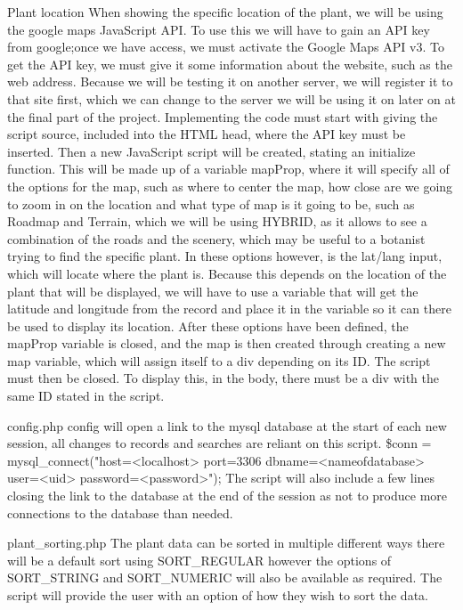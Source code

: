 Plant location
When showing the specific location of the plant, we will be using the google maps JavaScript API. To use this we will have to gain an API key from google;once we have access, we must activate the Google Maps API v3. To get the API key, we must give it some information about the website, such as the web address. Because we will be testing it on another server, we will register it to that site first, which we can change to the server we will be using it on later on at the final part of the project.
Implementing the code must start with giving the script source, included into the HTML head, where the API key must be inserted.  Then a new JavaScript script will be created, stating an initialize function. This will be made up of a variable mapProp, where it will specify all of the options for the map, such as where to center the map, how close are we going to zoom in on the location and what type of map is it going to be, such as Roadmap and Terrain, which we will be using HYBRID, as it allows to see a combination of the roads and the scenery, which may be useful to a botanist trying to find the specific plant. In these options however, is the lat/lang input, which will locate where the plant is. Because this depends on the location of the plant that will be displayed, we will have to use a variable that will get the latitude and longitude from the record and place it in the variable so it can there be used to display its location. After these options have been defined, the mapProp variable is closed, and the map is then created through creating a new map variable, which will assign itself to a div depending on its ID. The script must then be closed. To display this, in the body, there must be a div with the same ID stated in the script. 

config.php
config will open a link to the mysql database at the start of each new session, all changes to records and searches are reliant on this script.
\$conn = mysql\_connect("host=<localhost> 
port=3306 dbname=<nameofdatabase> 
user=<uid> password=<password>");
The script will also include a few lines closing the link to the database at the end of the session as not to produce more connections to the database than needed.

plant\_sorting.php
The plant data can be sorted in multiple different ways there will be a default sort using SORT\_REGULAR however the options of SORT\_STRING and SORT\_NUMERIC will also be available as required. The script will provide the user with an option of how they wish to sort the data.

